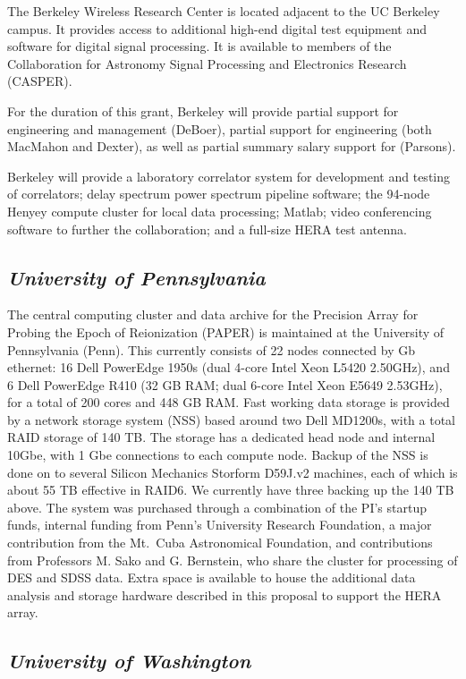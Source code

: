 \documentclass[11pt]{article}
\begin{document}
The Berkeley Wireless Research Center is located adjacent to the UC Berkeley
campus. It provides access to additional high-end digital test equipment and
software for digital signal processing.  It is available to members of the
Collaboration for Astronomy Signal Processing and Electronics Research (CASPER).

For the duration of this grant, Berkeley will provide partial support for engineering and management (DeBoer), 
partial support for engineering (both MacMahon and Dexter),
as well as partial summary salary support for (Parsons).

Berkeley will provide a laboratory correlator system for development and
testing of correlators; delay spectrum power spectrum pipeline software; the
94-node Henyey compute cluster for local data processing; Matlab; video
conferencing software to further the collaboration; and a full-size HERA test
antenna.

\subsection*{\it University of Pennsylvania}

The central computing cluster and data archive for the Precision Array for
Probing the Epoch of Reionization (PAPER) is maintained at the University of
Pennsylvania (Penn).  This currently consists of 22 nodes connected by Gb
ethernet: 16 Dell PowerEdge 1950s (dual 4-core Intel Xeon L5420 \@ 2.50GHz),
and 6 Dell PowerEdge R410 (32 GB RAM; dual 6-core Intel Xeon E5649 \@ 2.53GHz),
for a total of 200 cores and 448 GB RAM.  Fast working data storage is provided
by a network storage system (NSS) based around two Dell MD1200s, with a total
RAID storage of 140 TB.  The storage has a dedicated head node and internal
10Gbe, with 1 Gbe connections to each compute node. Backup of the NSS is done
on to several Silicon Mechanics Storform D59J.v2 machines, each of which is
about 55 TB effective in RAID6.  We currently have three backing up the 140 TB
above. The system was purchased through a combination of the PI's startup
funds, internal funding from Penn's University Research Foundation, a major
contribution from the Mt.~Cuba Astronomical Foundation, and contributions from
Professors M. Sako and G. Bernstein, who share the cluster for processing of
DES and SDSS data.  Extra space is available to house the additional data
analysis and storage hardware described in this proposal to support the HERA
array.


\subsection*{\it University of Washington}
\end{document}
